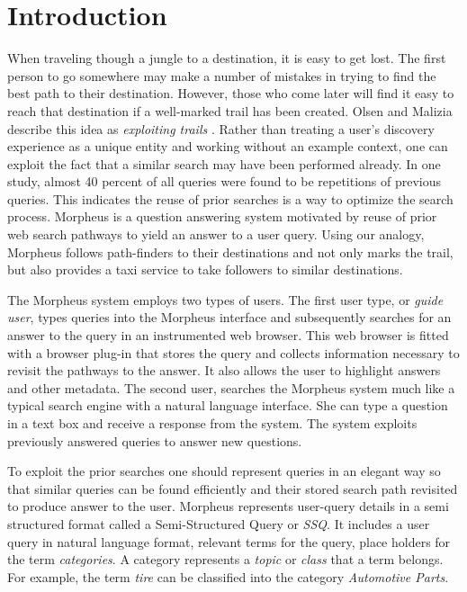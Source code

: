 \section{Introduction}



When traveling though a jungle to a destination, it is easy to get
lost.  The first person to go somewhere may make a number of mistakes
in trying to find the best path to their destination.  However, those
who come later will find it easy to reach that destination if a
well-marked trail has been created. Olsen and Malizia describe this
idea as \emph{exploiting trails} \cite{5379671}.  Rather than treating
a user's discovery experience as a unique entity and working without an example
context, one can exploit the fact that a similar search may have been
performed already.  In one study, almost 40 percent of all queries
were found to be repetitions of previous queries\cite{1277770}. This
indicates the reuse of prior searches is a way to optimize the search
process.  Morpheus is a question answering system motivated by reuse of prior web search pathways to yield an answer to a user query. Using our analogy, Morpheus follows path-finders to their destinations and not only marks the trail, but also provides a taxi service to take followers to similar destinations.

The Morpheus system employs two types of users. The first user type, or \textit{guide user}, types queries into the Morpheus interface and subsequently searches for an answer to the query in an instrumented web browser.  This web browser is fitted with a browser plug-in that stores the query and collects information necessary to revisit the pathways to the answer. It also allows the user to highlight answers and other metadata.
The second user, searches the Morpheus system much
like a typical search engine with a natural language interface. She can type a
question in a text box and receive a response from the system. The system
exploits previously answered queries to answer new questions.

To exploit the prior searches one should represent queries in an elegant way so
that similar queries can be found efficiently and their stored search path
revisited to produce answer to the user. Morpheus represents user-query details in a semi structured format called a Semi-Structured Query or \textit{SSQ}. It includes a user query in natural language format, relevant terms for the query, place holders for the term \textit{categories}. A category represents a \textit{topic} or \textit{class} that a term belongs. For example, the term \textit{tire} can be classified into the category \textit{Automotive Parts}. 


